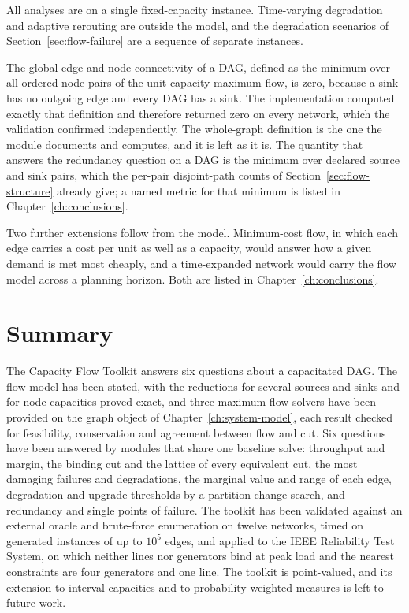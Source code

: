 \documentclass[12pt]{report}
\begin{document}
All analyses are on a single fixed-capacity instance. Time-varying degradation and adaptive
rerouting are outside the model, and the degradation scenarios of
Section~\ref{sec:flow-failure} are a sequence of separate instances.

The global edge and node connectivity of a DAG, defined as the minimum over all ordered node
pairs of the unit-capacity maximum flow, is zero, because a sink has no outgoing edge and
every DAG has a sink. The implementation computed exactly that definition and therefore
returned zero on every network, which the validation confirmed independently. The
whole-graph definition is the one the module documents and computes, and it is left as it
is. The quantity that answers the redundancy question on a DAG is the minimum over declared
source and sink pairs, which the per-pair disjoint-path counts of
Section~\ref{sec:flow-structure} already give; a named metric for that minimum is listed in
Chapter~\ref{ch:conclusions}.

Two further extensions follow from the model. Minimum-cost flow, in which each edge carries a
cost per unit as well as a capacity, would answer how a given demand is met most cheaply, and
a time-expanded network would carry the flow model across a planning horizon. Both are listed
in Chapter~\ref{ch:conclusions}.

\section{Summary}
\label{sec:flow-summary}

The Capacity Flow Toolkit answers six questions about a capacitated DAG. The flow model has
been stated, with the reductions for several sources and sinks and for node
capacities proved exact, and three maximum-flow solvers have been provided on the graph
object of Chapter~\ref{ch:system-model}, each result checked for feasibility, conservation
and agreement between flow and cut. Six questions have been answered by modules that share
one baseline solve: throughput and margin, the binding cut and the lattice of every
equivalent cut, the most damaging failures and degradations, the marginal value and range of
each edge, degradation and upgrade thresholds by a partition-change search, and redundancy
and single points of failure. The toolkit has been validated against an external oracle and
brute-force enumeration on twelve networks, timed on generated instances of up to $10^5$
edges, and applied to the IEEE Reliability Test System, on which neither lines nor generators
bind at peak load and the nearest constraints are four generators and one line. The toolkit is point-valued, and its extension to interval
capacities and to probability-weighted measures is left to future work.

\ifdefined\maindoc
\else
\printbibliography
\end{document}
